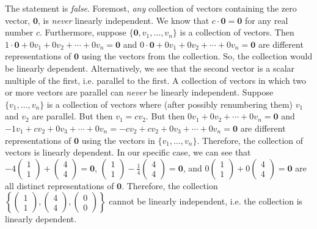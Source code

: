 \documentclass[11pt,letterpaper]{article}
\begin{document}
\sol The statement is \textit{false}. Foremost, \textit{any} collection of vectors containing the zero vector, $\mathbf{0}$, is \textit{never} linearly independent. We know that $c \cdot \mathbf{0}= \mathbf{0}$ for any real number $c$. Furthermore, suppose $\{ \mathbf{0}, v_1, \ldots, v_n \}$ is a collection of vectors. Then $1 \cdot \mathbf{0} + 0 v_1 + 0 v_2 + \cdots + 0 v_n= \mathbf{0}$ and $0 \cdot \mathbf{0} + 0 v_1 + 0 v_2 + \cdots + 0 v_n= \mathbf{0}$ are different representations of $\mathbf{0}$ using the vectors from the collection. So, the collection would be linearly dependent. Alternatively, we see that the second vector is a scalar multiple of the first, i.e. parallel to the first. A collection of vectors in which two or more vectors are parallel can \textit{never} be linearly independent. Suppose $\{ v_1, \ldots, v_n \}$ is a collection of vectors where (after possibly renumbering them) $v_1$ and $v_2$ are parallel. But then $v_1= c v_2$. But then $0 v_1 + 0v_2 + \cdots + 0 v_n= \mathbf{0}$ and $-1 v_1 + cv_2 + 0v_3 + \cdots + 0v_n= -cv_2 + cv_2 + 0v_3 + \cdots + 0v_n= \mathbf{0}$ are different representations of $\mathbf{0}$ using the vectors in $\{ v_1, \ldots, v_n \}$. Therefore, the collection of vectors is linearly dependent. In our specific case, we can see that $-4 \begin{pmatrix} 1 \\ 1 \end{pmatrix} + \begin{pmatrix} 4 \\ 4 \end{pmatrix}= \mathbf{0}$, $\begin{pmatrix} 1 \\ 1 \end{pmatrix} - \frac{1}{4} \begin{pmatrix} 4 \\ 4 \end{pmatrix}= \mathbf{0}$, and $0 \begin{pmatrix} 1 \\ 1 \end{pmatrix} + 0\begin{pmatrix} 4 \\ 4 \end{pmatrix}= \mathbf{0}$ are all distinct representations of $\mathbf{0}$. Therefore, the collection $\left\{ \begin{pmatrix} 1 \\ 1 \end{pmatrix}, \begin{pmatrix} 4 \\ 4 \end{pmatrix}, \begin{pmatrix} 0 \\ 0 \end{pmatrix} \right\}$ cannot be linearly independent, i.e. the collection is linearly dependent. \pvspace{1.3cm}
\end{document}
